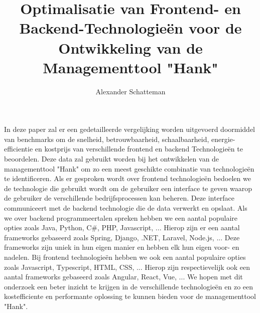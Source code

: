 \documentclass{hogent-article}
\title{Optimalisatie van Frontend- en Backend-Technologieën voor de Ontwikkeling van de Managementtool "Hank"}
\author{Alexander Schatteman}
\begin{document}
In deze paper zal er een gedetailleerde vergelijking worden uitgevoerd doormiddel van benchmarks om de snelheid, betrouwbaarheid, schaalbaarheid, 
energie-efficientie en kostprijs van verschillende frontend en backend Technologieën te beoordelen.
Deze data zal gebruikt worden bij het ontwikkelen van de managementtool "Hank" om 
zo een meest geschikte combinatie van technologieën te identificeren. 
Als er gesproken wordt over frontend technologieën bedoelen we de technologie die gebruikt wordt 
om de gebruiker een interface te geven waarop de gebruiker de verschillende bedrijfsprocessen kan beheren. 
Deze interface communiceert met de backend technologie die de data verwerkt en opslaat.
Als we over backend programmeertalen spreken hebben we een aantal populaire opties zoals Java, Python, C\#, PHP, Javascript, ...
Hierop zijn er een aantal frameworks gebaseerd zoals Spring, Django, .NET, Laravel, Node.js, ...
Deze frameworks zijn uniek in hun eigen manier en hebben elk hun eigen voor- en nadelen. 
Bij frontend technologieën hebben we ook een aantal populaire opties zoals Javascript, Typescript, HTML, CSS, ...
Hierop zijn respectievelijk ook een aantal frameworks gebaseerd zoals Angular, React, Vue, ...
We hopen met dit onderzoek een beter inzicht te krijgen in de verschillende technologieën en zo 
een kostefficiente en performante oplossing te kunnen bieden voor de managementtool "Hank".
\begin{abstract}


\end{abstract}

\tableofcontents



\printbibliography[heading=bibintoc]
\end{document}
